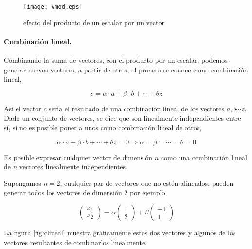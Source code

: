 \begin{figure}[h]
\centering
\texttt{[image: vmod.eps]}
\caption{efecto del producto de un escalar por un vector}
\label{fig:vmod}
\end{figure}
\begin{paracol}{2}
\paragraph{Combinación lineal.} Combinando la suma de vectores, con el producto por un escalar, podemos generar nuevos vectores, a partir de otros, el proceso se conoce como combinación lineal,
\end{paracol}
\begin{equation*}
c=\alpha \cdot a + \beta \cdot b + \cdots +\theta z
\end{equation*}
\begin{paracol}{2}
Así el vector $c$ sería el resultado de una combinación  lineal de los vectores $a, b \cdots z$. 
Dado un conjunto de vectores, se dice que son linealmente independientes entre sí, si no es posible poner a unos como combinación lineal de otros,
\end{paracol}
\begin{equation*}
\alpha \cdot a + \beta \cdot b + \cdots +\theta z=0 \Rightarrow \alpha =\beta =\cdots =\theta =0
\end{equation*}

\begin{paracol}{2}
Es posible expresar cualquier vector de dimensión $n$ como una combinación lineal de $n$ vectores linealmente independientes.

Supongamos $n=2$, cualquier par de vectores que no estén alineados, pueden generar todos los vectores de dimensión $2$ por ejemplo,
\end{paracol}

\begin{equation*}
\begin{pmatrix}
x_1\\
x_2
\end{pmatrix}=
\alpha \begin{pmatrix}
1\\
2
\end{pmatrix}+\beta \begin{pmatrix}
-1\\
1
\end{pmatrix}
\end{equation*}

La figura \ref{fig:clineal} muestra gráficamente estos dos vectores y algunos de los vectores resultantes de combinarlos linealmente.

